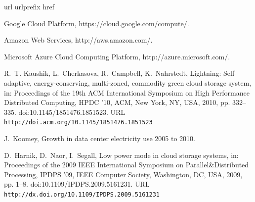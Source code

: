 \documentclass[preprint,12pt]{elsarticle}
\begin{document}





\begin{thebibliography}{10}
\expandafter\ifx\csname url\endcsname\relax
  \def\url#1{\texttt{#1}}\fi
\expandafter\ifx\csname urlprefix\endcsname\relax\def\urlprefix{URL }\fi
\expandafter\ifx\csname href\endcsname\relax
  \def\href#1#2{#2} \def\path#1{#1}\fi

{Google Cloud Platform}, https://cloud.google.com/compute/.

{Amazon Web Services}, http://aws.amazon.com/.

{Microsoft Azure Cloud Computing Platform}, http://azure.microsoft.com/.

R.~T. Kaushik, L.~Cherkasova, R.~Campbell, K.~Nahrstedt,
  \href{http://doi.acm.org/10.1145/1851476.1851523}{Lightning: Self-adaptive,
  energy-conserving, multi-zoned, commodity green cloud storage system}, in:
  Proceedings of the 19th ACM International Symposium on High Performance
  Distributed Computing, HPDC '10, ACM, New York, NY, USA, 2010, pp. 332--335.
\newblock \href {http://dx.doi.org/10.1145/1851476.1851523}
  {\path{doi:10.1145/1851476.1851523}}.
\newline\urlprefix\url{http://doi.acm.org/10.1145/1851476.1851523}

J.~Koomey, Growth in data center electricity use 2005 to 2010.

D.~Harnik, D.~Naor, I.~Segall,
  \href{http://dx.doi.org/10.1109/IPDPS.2009.5161231}{Low power mode in cloud
  storage systems}, in: Proceedings of the 2009 IEEE International Symposium on
  Parallel\&Distributed Processing, IPDPS '09, IEEE Computer Society,
  Washington, DC, USA, 2009, pp. 1--8.
\newblock \href {http://dx.doi.org/10.1109/IPDPS.2009.5161231}
  {\path{doi:10.1109/IPDPS.2009.5161231}}.
\newline\urlprefix\url{http://dx.doi.org/10.1109/IPDPS.2009.5161231}


\end{thebibliography}
\end{document}

